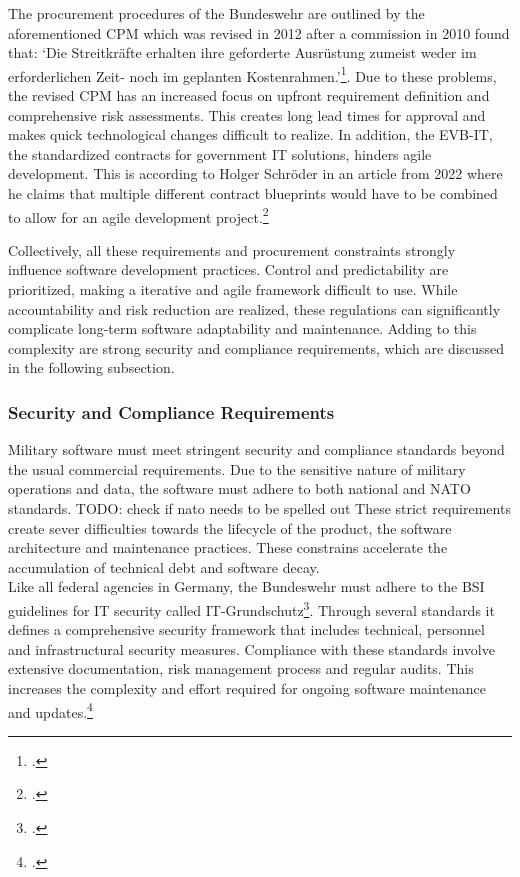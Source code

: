 The procurement procedures of the Bundeswehr are outlined by the aforementioned \ac{CPM} which was revised in 2012 after a commission in 2010 found that: 
`Die Streitkräfte erhalten ihre geforderte Ausrüstung zumeist weder im erforderlichen Zeit- noch im geplanten Kostenrahmen.'\footcite[36]{strukturkommissionderbundeswehrBerichtStrukturkommissionBundeswehr2010}.
Due to these problems, the revised \ac{CPM} has an increased focus on upfront requirement definition and comprehensive risk assessments. This creates long lead times
for approval and makes quick technological changes difficult to realize.
In addition, the \ac{EVB-IT}, the standardized contracts for government IT solutions, hinders agile development. This is according to Holger Schröder in an article  from 2022
where he claims that multiple different contract blueprints would have to be combined to allow for an agile development project.\footcite{schroederUngeeignetFuerAgile2022}

Collectively, all these requirements and procurement constraints strongly influence software development practices. Control and predictability are prioritized, making
a iterative and agile framework difficult to use. While accountability and risk reduction are realized, these regulations can significantly complicate long-term software
adaptability and maintenance. Adding to this complexity are strong security and compliance requirements, which are discussed in the following subsection.

\subsubsection{Security and Compliance Requirements}
Military software must meet stringent security and compliance standards beyond the usual commercial requirements. Due to the sensitive nature of military operations and data,
the software must adhere to both national and NATO standards. TODO: check if nato needs to be spelled out These strict requirements create sever difficulties 
towards the lifecycle of the product, the software architecture and maintenance practices. These constrains accelerate the accumulation of technical debt and software decay.\\

Like all federal agencies in Germany, the Bundeswehr must adhere to the \ac{BSI} guidelines for IT security called IT-Grundschutz\footcite{bundesamtfuersicherheitinderinformationstechnikBSIFAQ}. Through several standards it defines a comprehensive security framework
that includes technical, personnel and infrastructural security measures. Compliance with these standards involve extensive documentation, risk management process and regular audits. This increases the complexity and effort required for ongoing software maintenance and updates.\footcite{bundesamtfuersicherheitinderinformationstechnikBSIStandards}\\

